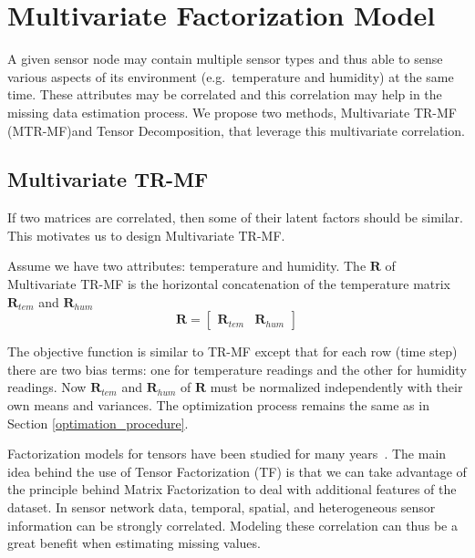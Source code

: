 
\section{Multivariate Factorization Model} \label{sec:tf}
A given sensor node may contain multiple sensor types and thus able to sense various aspects of its environment (e.g.\ temperature and humidity) at the same time.
These attributes may be correlated and this correlation may help in the missing data estimation process.
We propose two methods, Multivariate TR-MF (MTR-MF)and Tensor Decomposition, that leverage this multivariate correlation.

\subsection{Multivariate TR-MF} \label{subsec:Multivariate_TRMF}
If two matrices are correlated, then some of their latent factors should be similar.
This motivates us to design Multivariate TR-MF.

Assume we have two attributes: temperature and humidity.
The $\mathbf{R}$ of Multivariate TR-MF is the horizontal concatenation of the temperature matrix $\mathbf{R}_{tem}$ and $\mathbf{R}_{hum}$
\begin{equation*} \mathbf{R} = \begin{bmatrix}\mathbf{R}_{tem} & \mathbf{R}_{hum} \end{bmatrix} \end{equation*}

The objective function is similar to TR-MF except that for each row (time step) there are two bias terms: one for temperature readings and the other for humidity readings.
Now $\mathbf{R}_{tem}$ and $\mathbf{R}_{hum}$ of $\mathbf{R}$ must be normalized independently with their own means and variances.
The optimization process remains the same as in Section \ref{optimation_procedure}.


Factorization models for tensors have been studied for many years~\cite{karatzoglou2010multiverse}.
The main idea behind the use of Tensor Factorization (TF) is that we can take advantage of the principle behind Matrix Factorization to deal with additional features of the dataset. %
In sensor network data, temporal, spatial, and heterogeneous sensor information can be strongly correlated.
Modeling these correlation can thus be a great benefit when estimating missing values.
 
